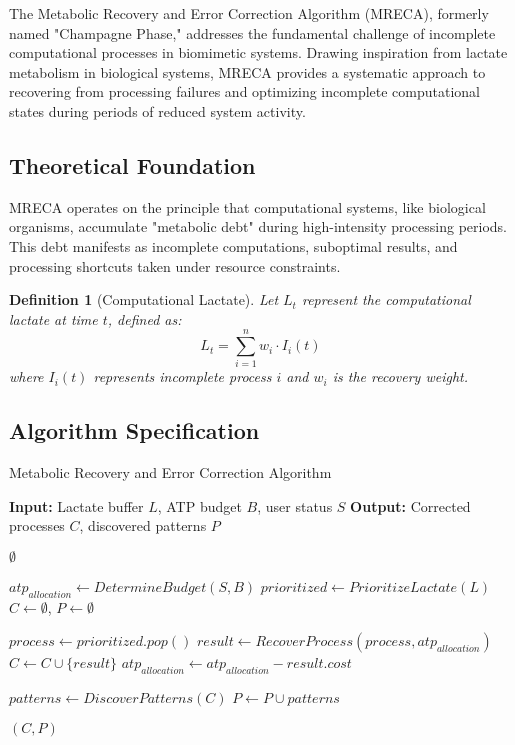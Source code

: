 \documentclass[12pt,a4paper]{article}
\newtheorem{definition}[theorem]{Definition}
\begin{document}
The Metabolic Recovery and Error Correction Algorithm (MRECA), formerly named "Champagne Phase," addresses the fundamental challenge of incomplete computational processes in biomimetic systems. Drawing inspiration from lactate metabolism in biological systems, MRECA provides a systematic approach to recovering from processing failures and optimizing incomplete computational states during periods of reduced system activity.

\subsection{Theoretical Foundation}

MRECA operates on the principle that computational systems, like biological organisms, accumulate "metabolic debt" during high-intensity processing periods. This debt manifests as incomplete computations, suboptimal results, and processing shortcuts taken under resource constraints.

\begin{definition}[Computational Lactate]
Let $L_t$ represent the computational lactate at time $t$, defined as:
\begin{equation}
L_t = \sum_{i=1}^{n} w_i \cdot I_i(t)
\end{equation}
where $I_i(t)$ represents incomplete process $i$ and $w_i$ is the recovery weight.
\end{definition}

\subsection{Algorithm Specification}

\begin{algorithm}[H]
\caption{Metabolic Recovery and Error Correction Algorithm}
\begin{algorithmic}[1]
\State \textbf{Input:} Lactate buffer $L$, ATP budget $B$, user status $S$
\State \textbf{Output:} Corrected processes $C$, discovered patterns $P$

        \State \Return $\emptyset$ 
    \EndIf
    
    \State $atp_{allocation} \leftarrow DetermineBudget(S, B)$
    \State $prioritized \leftarrow PrioritizeLactate(L)$
    \State $C \leftarrow \emptyset$, $P \leftarrow \emptyset$
    
        \State $process \leftarrow prioritized.pop()$
        \State $result \leftarrow RecoverProcess(process, atp_{allocation})$
        \State $C \leftarrow C \cup \{result\}$
        \State $atp_{allocation} \leftarrow atp_{allocation} - result.cost$
        
            \State $patterns \leftarrow DiscoverPatterns(C)$
            \State $P \leftarrow P \cup patterns$
        \EndIf
    \EndWhile
    
    \State \Return $(C, P)$
\EndFunction
\end{algorithmic}
\end{algorithm}
\end{document}
